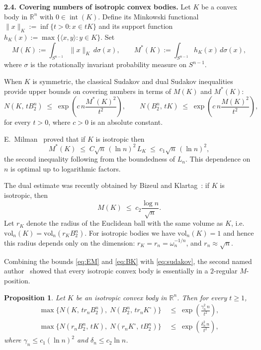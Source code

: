 \documentclass[11pt,leqno]{article}
\newtheorem{proposition}[theorem]{Proposition}
\theoremstyle{definition}
\theoremstyle{remark}
\numberwithin{equation}{section}
\newcommand{\vol}{\mathrm{vol}}
\newcommand{\ls}{\leqslant}
\newcommand{\gr}{\geqslant}
\begin{document}
\bigskip 

\textbf{2.4. Covering numbers of isotropic convex bodies.} Let $K$ be a convex body in $\mathbb{R}^n$ with $0 \in \operatorname{int}(K)$.  
Define its Minkowski functional $\|x\|_K := \inf \{ t>0 : x \in tK \}$
and its support function $h_K(x) := \max \{ \langle x,y\rangle : y \in K \}$. Set
$$M(K) := \int_{S^{n-1}} \|x\|_K\, d\sigma(x), \qquad
M^{\ast}(K) := \int_{S^{n-1}} h_K(x)\, d\sigma(x),$$
where $\sigma$ is the rotationally invariant probability measure on $S^{n-1}$.

When $K$ is symmetric, the classical Sudakov and dual Sudakov inequalities~\cite[Chapter~4]{AGA-book} provide upper bounds 
on covering numbers in terms of $M(K)$ and $M^*(K)$:
\begin{equation}\label{eq:sudakov}N(K,\, t B_2^n)\;\ls\; \exp\!\left( c\, n \frac{M^{*}(K)^2}{t^2} \right),
\qquad
N(B_2^n,\, tK)\;\ls\; \exp\!\left( c\, n \frac{M(K)^2}{t^2} \right),\end{equation}
for every $t>0$, where $c>0$ is an absolute constant.  

E.~Milman~\cite{EMilman-2014} proved that if $K$ is isotropic then
\begin{equation}\label{eq:EM}
M^{\ast}(K)\;\ls\; C \sqrt{n}\, (\ln n)^2\, L_K\;\ls\; c_1 \sqrt{n}\, (\ln n)^2,
\end{equation}
the second inequality following from the boundedness of $L_n$.  
This dependence on $n$ is optimal up to logarithmic factors.

The dual estimate was recently obtained by Bizeul and Klartag~\cite{Bizeul-Klartag-2025}: if $K$ is isotropic, then
\begin{equation}\label{eq:BK}
M(K) \;\ls\; c_2 \frac{\log n}{\sqrt{n}}.
\end{equation}
Let $r_K$ denote the radius of the Euclidean ball with the same volume as $K$, i.e. 
$\vol_n(K)=\vol_n(r_K B_2^n)$. 
For isotropic bodies we have $\vol_n(K)=1$ and hence this radius depends only on the dimension:
$r_K=r_n=\omega_n^{-1/n}$, and $r_n \approx \sqrt{n}$. 

Combining the bounds \eqref{eq:EM} and \eqref{eq:BK} with \eqref{eq:sudakov}, the second named author~\cite{Tziotziou-2025} 
showed that every isotropic convex body is essentially in a $2$-regular $M$-position.  

\begin{proposition}\label{prop:M-position}
Let $K$ be an isotropic convex body in $\mathbb{R}^n$.  
Then for every $t\gr 1$,
\begin{align}
\max\{ N(K,\, t r_n B_2^n),\; N(B_2^n,\, t r_n K^{\circ}) \}
&\;\ls\;
\exp\!\left( \frac{\gamma_n^2\, n}{t^2} \right),
\label{eq:M-position-a}
\\[0.2cm]
\max\{ N(r_n B_2^n,\, t K),\; N(r_n K^{\circ},\, t B_2^n) \}
&\;\ls\;
\exp\!\left( \frac{\delta_n^2\, n}{t^2} \right),
\label{eq:M-position-b}
\end{align}
where $\gamma_n \ls c_1 (\ln n)^2$ and $\delta_n \ls c_2 \ln n$.
\end{proposition}
\end{document}
